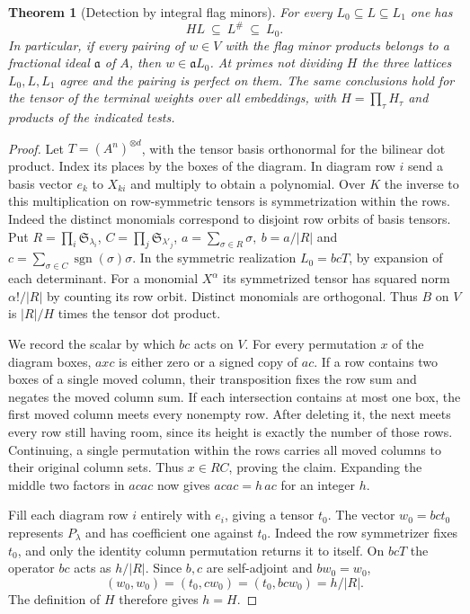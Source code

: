 \documentclass[a4paper,11pt]{article}
\newtheorem{theorem}[proposition]{Theorem}
\theoremstyle{definition}
\theoremstyle{remark}
\numberwithin{equation}{section}
\begin{document}
\begin{theorem}[Detection by integral flag minors]\leavevmode
\label{thm:terminaldual325}
For every \(L_0\subseteq L\subseteq L_1\) one has
\[
                 H L\ \subseteq\ L^\#\ \subseteq\ L_0 .
\]
In particular, if every pairing of \(w\in V\) with the
flag minor products belongs to a fractional ideal
\(\mathfrak a\) of \(A\), then \(w\in\mathfrak a L_0\).
At primes not dividing \(H\) the three lattices
\(L_0,L,L_1\) agree and the pairing is perfect on them.
The same conclusions hold for the tensor of the terminal
weights over all embeddings, with \(H=\prod_\tau H_\tau\)
and products of the indicated tests.
\end{theorem}
\begin{proof}
Let \(T=(A^n)^{\otimes d}\), with the tensor basis
orthonormal for the bilinear dot product. Index its places
by the boxes of the diagram. In diagram row \(i\) send a
basis vector \(e_k\) to \(X_{ki}\) and multiply to obtain
a polynomial. Over \(K\) the inverse to this multiplication
on row-symmetric tensors is symmetrization within the rows.
Indeed the distinct monomials correspond to disjoint row
orbits of basis tensors. Put \(R=\prod_i\mathfrak S_{\lambda_i}\),
\(C=\prod_j\mathfrak S_{\lambda'_j}\),
\(a=\sum_{\sigma\in R}\sigma,\ b=a/|R|\) and
\(c=\sum_{\sigma\in C}\operatorname{sgn}(\sigma)\sigma\).
In the symmetric realization \(L_0=bcT\), by expansion of
each determinant. For a monomial \(X^\alpha\) its
symmetrized tensor has squared norm \(\alpha!/|R|\) by
counting its row orbit. Distinct monomials are orthogonal.
Thus \(B\) on \(V\) is \(|R|/H\) times the tensor dot product.

We record the scalar by which \(bc\) acts on \(V\).
For every permutation \(x\) of the diagram boxes, \(axc\)
is either zero or a signed copy of \(ac\). If a row contains
two boxes of a single moved column, their transposition
fixes the row sum and negates the moved column sum. If each
intersection contains at most one box, the first moved
column meets every nonempty row. After deleting it, the
next meets every row still having room, since its height
is exactly the number of those rows. Continuing, a single
permutation within the rows carries all moved columns to
their original column sets. Thus \(x\in RC\), proving
the claim. Expanding the middle two factors in \(acac\)
now gives \(acac=h\,ac\) for an integer \(h\).

Fill each diagram row \(i\) entirely with \(e_i\), giving
a tensor \(t_0\). The vector \(w_0=bc t_0\) represents
\(P_\lambda\) and has coefficient one against \(t_0\).
Indeed the row symmetrizer fixes \(t_0\), and only the identity
column permutation returns it to itself. On \(bcT\) the
operator \(bc\) acts as \(h/|R|\). Since \(b,c\) are
self-adjoint and \(bw_0=w_0\),
\[
 (w_0,w_0)=(t_0,cw_0)=(t_0,bcw_0)=h/|R|.
\]
The definition of \(H\) therefore gives \(h=H\).


\end{proof}
\end{document}
